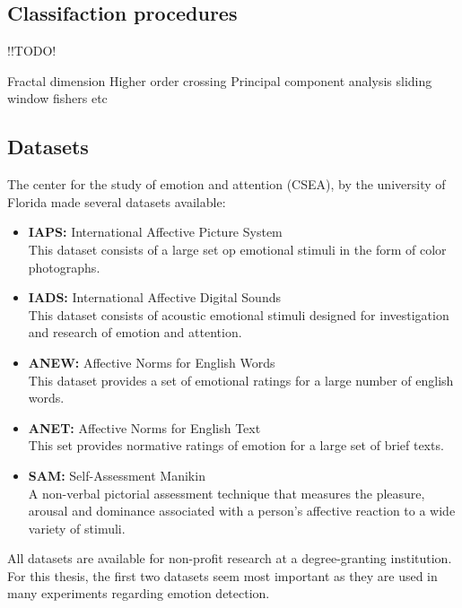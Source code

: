 \subsection{Classifaction procedures}
!!TODO!

Fractal dimension %
Higher order crossing
Principal component analysis
sliding window
fishers
etc


\subsection{Datasets}
The center for the study of emotion and attention (CSEA), by the university of Florida made several datasets available:
\begin{itemize}
\item \textbf{IAPS:} International Affective Picture System\\
This dataset consists of a large set op emotional stimuli in the form of color photographs.
\item \textbf{IADS:} International Affective Digital Sounds \\
This dataset consists of acoustic emotional stimuli designed for investigation and research of emotion and attention.
\item \textbf{ANEW:} Affective Norms for English Words\\
This dataset provides a set of emotional ratings for a large number of english words.
\item \textbf{ANET:} Affective Norms for English Text\\
This set provides normative ratings of emotion for a large set of brief texts.
\item \textbf{SAM:} Self-Assessment Manikin\\
A non-verbal pictorial assessment technique that measures the pleasure, arousal and dominance associated with a person's affective reaction to a wide variety of stimuli.
\end{itemize}
All datasets are available for non-profit research at a degree-granting institution\cite{DataSets}. For this thesis, the first two datasets seem most important as they are used in many experiments regarding emotion detection\cite{ExtendedPaper}\cite{EmotionSite}\cite{RealTimeEEGEmotion}\cite{EEGDatasets}.

